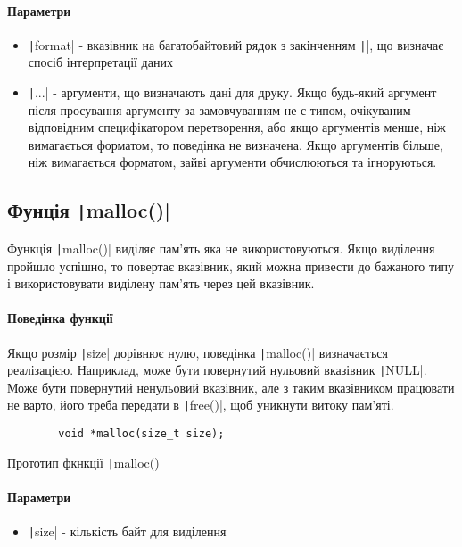 \paragraph{Параметри}
\begin{itemize}
	\item \texttt|format| - вказівник на багатобайтовий рядок з закінченням \texttt|\0|, що визначає спосіб інтерпретації даних
	\item \texttt|...| - аргументи, що визначають дані для друку. Якщо будь-який аргумент після просування аргументу за замовчуванням не є типом, очікуваним відповідним специфікатором перетворення, або якщо аргументів менше, ніж вимагається форматом, то поведінка не визначена. Якщо аргументів більше, ніж вимагається форматом, зайві аргументи обчислюються та ігноруються.
\end{itemize}

\subsection[Функція \code{malloc()}]{Фунція \texttt|malloc()|}
Функція \texttt|malloc()| виділяє пам'ять яка не використовуються. Якщо виділення пройшло успішно, то повертає вказівник, який можна привести до бажаного типу і використовувати виділену пам'ять через цей вказівник.
\paragraph{Поведінка функції}
Якщо розмір \texttt|size| дорівнює нулю, поведінка \texttt|malloc()| визначається реалізацією. Наприклад, може бути повернутий нульовий вказівник \texttt|NULL|. Може бути повернутий ненульовий вказівник, але з таким вказівником працювати не варто, його треба передати в \texttt|free()|, щоб уникнути витоку пам'яті.
\begin{listing}[H]
	\begin{verbatim}
		void *malloc(size_t size);
	\end{verbatim}
	\caption[Прототип ]{Прототип фкнкції \texttt|malloc()|}
	\label{lst:f:malloc}
\end{listing}
\paragraph{Параметри}
\begin{itemize}
	\item \texttt|size| - кількість байт для виділення
\end{itemize}

